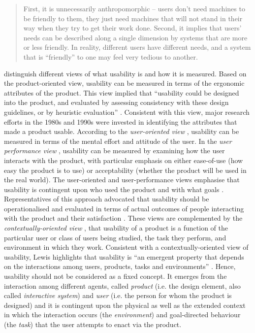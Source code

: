\begin{quote}
    First, it is unnecessarily anthropomorphic – users don’t need machines to be friendly to them, they just need machines that will not stand in their way when they try to get their work done. Second, it implies that users’ needs can be described along a single dimension by systems that are more or less friendly. In reality, different users have different needs, and a system that is ``friendly'' to one may feel very tedious to another. \citep[4]{nielsen2010}
\end{quote}
\citet{bevana1991usability} distinguish different views of what usability is and how it is measured. Based on the product-oriented view, usability can be measured in terms of the ergonomic attributes of the product. This view implied that ``usability could be designed into the product, and evaluated by assessing consistency with these design guidelines, or by heuristic evaluation'' \citep[143]{bevan2015iso}. Consistent with this view, major research efforts in the 1980s and 1990s were invested in identifying the attributes that made a product usable. According to the \textit{user-oriented view} \citep{bevana1991usability}, usability can be measured in terms of the mental effort and attitude of the user. In the \textit{user performance view} \citep{bevana1991usability}, usability can be measured by examining how the user interacts with the product, with particular emphasis on either ease-of-use (how easy the product is to use) or acceptability (whether the product will be used in the real world). The user-oriented and user-performance views emphasise that usability is contingent upon who used the product and with what goals \citep[143]{bevan2015iso}. Representatives of this approach advocated that usability should be operationalised and evaluated in terms of actual outcomes of people interacting with the product and their satisfaction \citep{whiteside1988usability}. These views are complemented by the \textit{contextually-oriented view} \citep{bevana1991usability}, that usability of a product is a function of the particular user or class of users being studied, the task they perform, and environment in which they work. Consistent with a contextually-oriented view of usability, Lewis highlights that usability is ``an emergent property that depends on the interactions among users, products, tasks and environments'' \citep[1267]{lewis2012}. Hence, usability should not be considered as a fixed concept. It emerges from the interaction among different agents, called \textit{product} (i.e. the design element, also called \textit{interactive system}) and \textit{user} (i.e. the person for whom the product is designed) and it is contingent upon the physical as well as the extended context in which the interaction occurs (the \textit{environment}) and goal-directed behaviour (the \textit{task}) that the user attempts to enact via the product.

